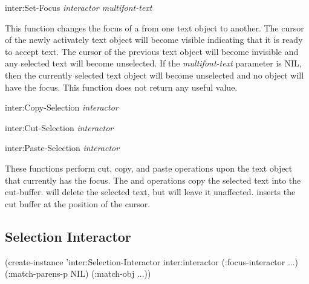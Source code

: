 \begin{programexample}
inter:Set-Focus {\it interactor multifont-text}\value{function}
\end{programexample}

This function changes the focus of a  from one
text object to another.  The cursor of the newly activately text object will
become visible indicating that it is ready to accept text.  The cursor of the
previous text object will become invisible and any selected text will become
unselected.  If the {\it multifont-text} parameter is NIL, then the currently
selected text object will become unselected and no object will have the
focus.  This function does not return any useful value.

\begin{programexample}
inter:Copy-Selection {\it interactor}\value{function}

inter:Cut-Selection {\it interactor}\value{function}

inter:Paste-Selection {\it interactor}\value{function}
\end{programexample}

These functions perform cut, copy, and paste operations upon the text object
that currently has the focus.  The  and 
operations copy the selected text into the cut-buffer.  
will delete the selected text, but  will leave it
unaffected.   inserts the cut buffer at the position of
the cursor.

\subsection{Selection Interactor}

\begin{programexample}

(create-instance 'inter:Selection-Interactor inter:interactor
   (:focus-interactor ...)
   (:match-parens-p NIL)
   (:match-obj ...))
\end{programexample}

